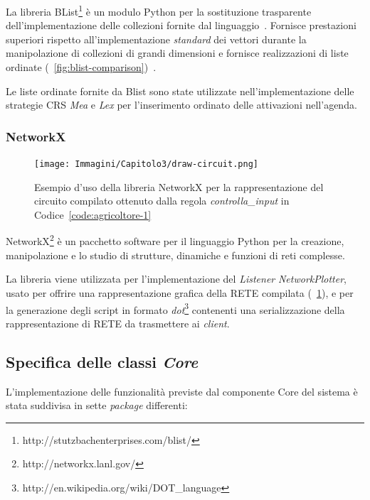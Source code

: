 La libreria BList\footnote{http://stutzbachenterprises.com/blist/} è un modulo Python per la sostituzione trasparente dell'implementazione delle collezioni fornite dal linguaggio~\cite{blist-manual}. Fornisce prestazioni superiori rispetto all'implementazione \emph{standard} dei vettori durante la manipolazione di collezioni di grandi dimensioni e fornisce realizzazioni di liste ordinate (\figurename~\ref{fig:blist-comparison})~\cite{blist-prest}.

Le liste ordinate fornite da Blist sono state utilizzate nell'implementazione delle strategie CRS \emph{Mea} e \emph{Lex} per l'inserimento ordinato delle attivazioni nell'agenda.


\subsubsection{NetworkX}

\begin{figure}
\centering
\texttt{[image: Immagini/Capitolo3/draw-circuit.png]}
\caption[Esempio d'uso della libreria NetworkX]{Esempio d'uso della libreria NetworkX per la rappresentazione del circuito compilato ottenuto dalla regola \emph{controlla\_input} in Codice~\ref{code:agricoltore-1}}\label{fig:networkx-example}
\end{figure}

NetworkX\footnote{http://networkx.lanl.gov/} è un pacchetto software per il linguaggio Python per la creazione, manipolazione e lo studio di strutture, dinamiche e funzioni di reti complesse.

La libreria viene utilizzata per l'implementazione del \emph{Listener} \emph{NetworkPlotter}, usato per offrire una rappresentazione grafica della RETE compilata (\figurename~\ref{fig:networkx-example}), e per la generazione degli script in formato \emph{dot}\footnote{http://en.wikipedia.org/wiki/DOT\_language} contenenti una serializzazione della rappresentazione di RETE da trasmettere ai \emph{client}.

\subsection{Specifica delle classi \emph{Core}}

L'implementazione delle funzionalità previste dal componente Core del sistema è stata suddivisa in sette \emph{package} differenti:

